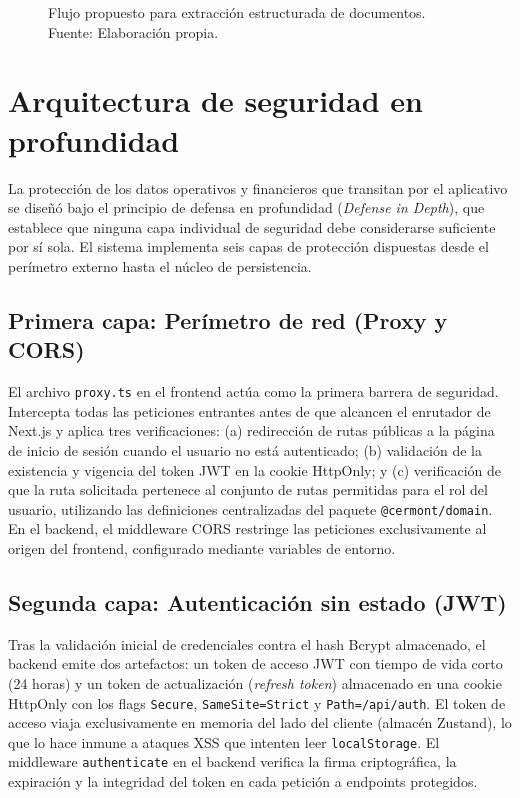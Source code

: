 \begin{figure}[!htbp]
\centering
\resizebox{0.95\textwidth}{!}{%
%
}
\caption{Flujo propuesto para extracción estructurada de documentos. Fuente: Elaboración propia.}
\label{fig:pipeline-formularios}
\end{figure}

\section{Arquitectura de seguridad en profundidad}
\label{sec:arquitectura-seguridad}

La protección de los datos operativos y financieros que transitan por el aplicativo se diseñó bajo el principio de defensa en profundidad (\textit{Defense in Depth}), que establece que ninguna capa individual de seguridad debe considerarse suficiente por sí sola. El sistema implementa seis capas de protección dispuestas desde el perímetro externo hasta el núcleo de persistencia.

\subsection{Primera capa: Perímetro de red (Proxy y CORS)}

El archivo \texttt{proxy.ts} en el frontend actúa como la primera barrera de seguridad. Intercepta todas las peticiones entrantes antes de que alcancen el enrutador de Next.js y aplica tres verificaciones: (a) redirección de rutas públicas a la página de inicio de sesión cuando el usuario no está autenticado; (b) validación de la existencia y vigencia del token JWT en la cookie HttpOnly; y (c) verificación de que la ruta solicitada pertenece al conjunto de rutas permitidas para el rol del usuario, utilizando las definiciones centralizadas del paquete \texttt{@cermont/domain}. En el backend, el middleware CORS restringe las peticiones exclusivamente al origen del frontend, configurado mediante variables de entorno.

\subsection{Segunda capa: Autenticación sin estado (JWT)}

Tras la validación inicial de credenciales contra el hash Bcrypt almacenado, el backend emite dos artefactos: un token de acceso JWT con tiempo de vida corto (24 horas) y un token de actualización (\textit{refresh token}) almacenado en una cookie HttpOnly con los flags \texttt{Secure}, \texttt{SameSite=Strict} y \texttt{Path=/api/auth}. El token de acceso viaja exclusivamente en memoria del lado del cliente (almacén Zustand), lo que lo hace inmune a ataques XSS que intenten leer \texttt{localStorage}. El middleware \texttt{authenticate} en el backend verifica la firma criptográfica, la expiración y la integridad del token en cada petición a endpoints protegidos.

